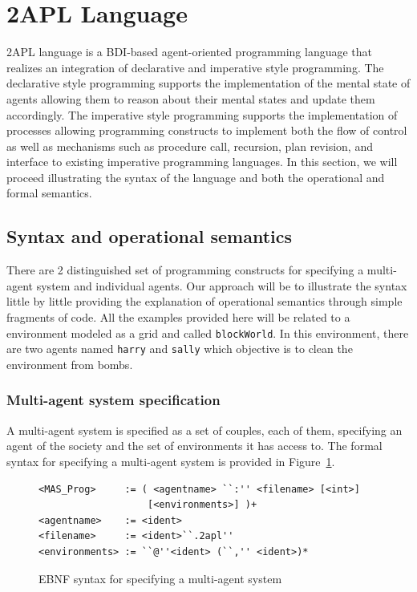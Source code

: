 \documentclass[a4paper]{article}
\begin{document}
\section{2APL Language}\label{sec:lang} 

2APL language is a BDI-based agent-oriented programming language that realizes an integration of declarative and imperative style programming. The declarative style programming supports the implementation of the mental state of agents allowing them to reason about their mental states and update them accordingly. The imperative style programming supports the implementation of  processes allowing programming constructs to implement both the flow of control as well as mechanisms such as procedure call, recursion, plan revision, and interface to existing imperative programming languages. In this section, we will proceed illustrating the syntax of the language and both the operational and formal semantics. %

\subsection{Syntax and operational semantics} %

There are 2 distinguished set of programming constructs for specifying a multi-agent system and individual agents. Our approach will be to illustrate the syntax little by little providing the explanation of operational semantics through simple fragments of code. All the examples provided here will be related to a environment modeled as a grid and called \texttt{blockWorld}. In this environment, there are two agents named \texttt{harry} and \texttt{sally} which objective is to clean the environment from bombs.

\subsubsection{Multi-agent system specification} %

A multi-agent system is specified as a set of couples, each of them, specifying an agent of the society and the set of environments it has access to. The formal syntax for specifying a multi-agent system is provided in Figure~\ref{fig:ebnf_mas}. 

\begin{figure}[htbp]
\begin{verbatim}
<MAS_Prog>     := ( <agentname> ``:'' <filename> [<int>]
                   [<environments>] )+
<agentname>    := <ident>
<filename>     := <ident>``.2apl''
<environments> := ``@''<ident> (``,'' <ident>)*
\end{verbatim}
\caption{EBNF syntax for specifying a multi-agent system}
\label{fig:ebnf_mas}
\end{figure}
\end{document}

